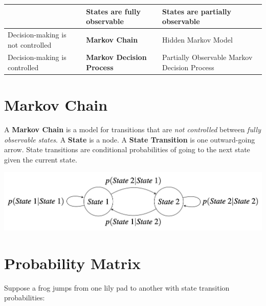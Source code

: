 \documentclass[
  letterpaper,
  DIV=11,
  numbers=noendperiod]{scrreprt}
\begin{document}
\begin{longtable}[]{@{}
  >{\raggedright\arraybackslash}p{}
  >{\raggedright\arraybackslash}p{}
  >{\raggedright\arraybackslash}p{}@{}}
\toprule\noalign{}
\begin{minipage}[b]{\linewidth}\raggedright
\end{minipage} & \begin{minipage}[b]{\linewidth}\raggedright
States are fully observable
\end{minipage} & \begin{minipage}[b]{\linewidth}\raggedright
States are partially observable
\end{minipage} \\
\midrule\noalign{}
\endhead
\bottomrule\noalign{}
\endlastfoot
Decision-making is not controlled & \textbf{Markov Chain} & Hidden
Markov Model \\
Decision-making is controlled & \textbf{Markov Decision Process} &
Partially Observable Markov Decision Process \\
\end{longtable}

\section{Markov Chain}\label{markov-chain-1}

A \textbf{Markov Chain} is a model for transitions that are \emph{not
controlled} between \emph{fully observable states}. A \textbf{State} is
a node. A \textbf{State Transition} is one outward-going arrow. State
transitions are conditional probabilities of going to the next state
given the current state.

\includegraphics[width=0.75\linewidth,height=\textheight,keepaspectratio]{lecture4/images/markovchain-ex.png}

\section{Probability Matrix}\label{probability-matrix}

Suppose a frog jumps from one lily pad to another with state transition
probabilities:
\end{document}
